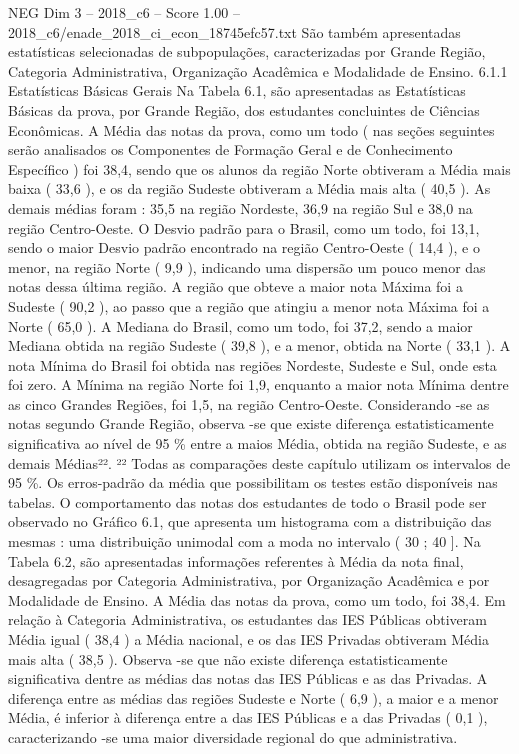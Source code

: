 \begin{textsample}{NEG Dim 3 – 2018\_c6 – Score 1.00 – 2018\_c6/enade\_2018\_ci\_econ\_18745efc57.txt}
São também apresentadas estatísticas selecionadas de subpopulações, caracterizadas por Grande Região, Categoria Administrativa, Organização Acadêmica e Modalidade de Ensino. 6.1.1 Estatísticas Básicas Gerais Na Tabela 6.1, são apresentadas as Estatísticas Básicas da prova, por Grande Região, dos estudantes concluintes de Ciências Econômicas.
A Média das notas da prova, como um todo ( nas seções seguintes serão analisados os Componentes de Formação Geral e de Conhecimento Específico ) foi 38,4, sendo que os alunos da região Norte obtiveram a Média mais baixa ( 33,6 ), e os da região Sudeste obtiveram a Média mais alta ( 40,5 ).
As demais médias foram : 35,5 na região Nordeste, 36,9 na região Sul e 38,0 na região Centro-Oeste.
O Desvio padrão para o Brasil, como um todo, foi 13,1, sendo o maior Desvio padrão encontrado na região Centro-Oeste ( 14,4 ), e o menor, na região Norte ( 9,9 ), indicando uma dispersão um pouco menor das notas dessa última região.
A região que obteve a maior nota Máxima foi a Sudeste ( 90,2 ), ao passo que a região que atingiu a menor nota Máxima foi a Norte ( 65,0 ).
A Mediana do Brasil, como um todo, foi 37,2, sendo a maior Mediana obtida na região Sudeste ( 39,8 ), e a menor, obtida na Norte ( 33,1 ).
A nota Mínima do Brasil foi obtida nas regiões Nordeste, Sudeste e Sul, onde esta foi zero.
A Mínima na região Norte foi 1,9, enquanto a maior nota Mínima dentre as cinco Grandes Regiões, foi 1,5, na região Centro-Oeste.
Considerando -se as notas segundo Grande Região, observa -se que existe diferença estatisticamente significativa ao nível de 95 \% entre a maios Média, obtida na região Sudeste, e as demais Médias²². ²² Todas as comparações deste capítulo utilizam os intervalos de 95 \%.
Os erros-padrão da média que possibilitam os testes estão disponíveis nas tabelas.
O comportamento das notas dos estudantes de todo o Brasil pode ser observado no Gráfico 6.1, que apresenta um histograma com a distribuição das mesmas : uma distribuição unimodal com a moda no intervalo ( 30 ; 40 ].
Na Tabela 6.2, são apresentadas informações referentes à Média da nota final, desagregadas por Categoria Administrativa, por Organização Acadêmica e por Modalidade de Ensino.
A Média das notas da prova, como um todo, foi 38,4.
Em relação à Categoria Administrativa, os estudantes das IES Públicas obtiveram Média igual ( 38,4 ) a Média nacional, e os das IES Privadas obtiveram Média mais alta ( 38,5 ).
Observa -se que não existe diferença estatisticamente significativa dentre as médias das notas das IES Públicas e as das Privadas.
A diferença entre as médias das regiões Sudeste e Norte ( 6,9 ), a maior e a menor Média, é inferior à diferença entre a das IES Públicas e a das Privadas ( 0,1 ), caracterizando -se uma maior diversidade regional do que administrativa.

\end{textsample}
